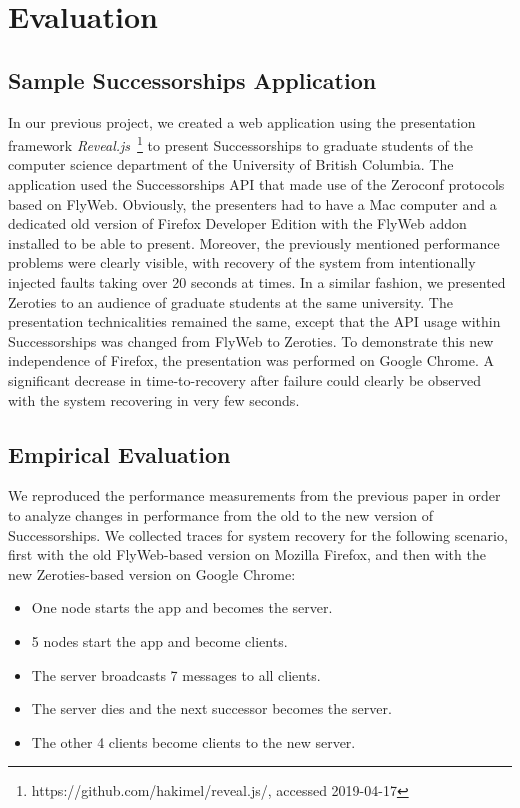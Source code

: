 \section{Evaluation}
\label{sec:evaluation}

\subsection{Sample Successorships Application}

In our previous project, we created a web application using the presentation framework \textit{Reveal.js}~\footnote{https://github.com/hakimel/reveal.js/, accessed 2019-04-17} to present Successorships to graduate students of the computer science department of the University of British Columbia.
The application used the Successorships API that made use of the Zeroconf protocols based on FlyWeb.
Obviously, the presenters had to have a Mac computer and a dedicated old version of Firefox Developer Edition with the FlyWeb addon installed to be able to present.
Moreover, the previously mentioned performance problems were clearly visible, with recovery of the system from intentionally injected faults taking over 20 seconds at times.
In a similar fashion, we presented Zeroties to an audience of graduate students at the same university.
The presentation technicalities remained the same, except that the API usage within Successorships was changed from FlyWeb to Zeroties.
To demonstrate this new independence of Firefox, the presentation was performed on Google Chrome.
A significant decrease in time-to-recovery after failure could clearly be observed with the system recovering in very few seconds.

\subsection{Empirical Evaluation}

We reproduced the performance measurements from the previous paper in order to analyze changes in performance from the old to the new version of Successorships.
We collected traces for system recovery for the following scenario, first with the old FlyWeb-based version on Mozilla Firefox, and then with the new Zeroties-based version on Google Chrome:
\begin{itemize}
\item One node starts the app and becomes the server.
\item 5 nodes start the app and become clients.
\item The server broadcasts 7 messages to all clients.
\item The server dies and the next successor becomes the server.
\item The other 4 clients become clients to the new server.
\end{itemize}

